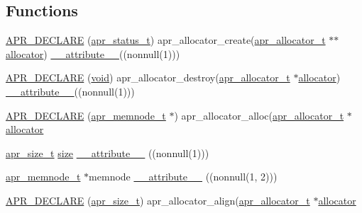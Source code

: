\subsection*{Functions}
\begin{DoxyCompactItemize}
\item 
\hyperlink{group__apr__allocator_ga9cb19a118179bbd8625eacfec66a9ab8}{A\+P\+R\+\_\+\+D\+E\+C\+L\+A\+RE} (\hyperlink{group__apr__errno_gaa5105fa83cc322f09382292db8b47593}{apr\+\_\+status\+\_\+t}) apr\+\_\+allocator\+\_\+create(\hyperlink{structapr__allocator__t}{apr\+\_\+allocator\+\_\+t} $\ast$$\ast$\hyperlink{group__apr__pools_ga3d4c7b6ba19a3b46b6fecdee3d867787}{allocator}) \hyperlink{group__APR__Util__Bucket__Brigades_gae0af316ed59541b70389da41aaeef4b6}{\+\_\+\+\_\+attribute\+\_\+\+\_\+}((nonnull(1)))
\item 
\hyperlink{group__apr__allocator_gab3ed16bee8def122c1d7c8f822ee0a5e}{A\+P\+R\+\_\+\+D\+E\+C\+L\+A\+RE} (\hyperlink{group__MOD__ISAPI_gacd6cdbf73df3d9eed42fa493d9b621a6}{void}) apr\+\_\+allocator\+\_\+destroy(\hyperlink{structapr__allocator__t}{apr\+\_\+allocator\+\_\+t} $\ast$\hyperlink{group__apr__pools_ga3d4c7b6ba19a3b46b6fecdee3d867787}{allocator}) \hyperlink{group__APR__Util__Bucket__Brigades_gae0af316ed59541b70389da41aaeef4b6}{\+\_\+\+\_\+attribute\+\_\+\+\_\+}((nonnull(1)))
\item 
\hyperlink{group__apr__allocator_ga1a358d9857909db42118ab336d2ed241}{A\+P\+R\+\_\+\+D\+E\+C\+L\+A\+RE} (\hyperlink{structapr__memnode__t}{apr\+\_\+memnode\+\_\+t} $\ast$) apr\+\_\+allocator\+\_\+alloc(\hyperlink{structapr__allocator__t}{apr\+\_\+allocator\+\_\+t} $\ast$\hyperlink{group__apr__pools_ga3d4c7b6ba19a3b46b6fecdee3d867787}{allocator}
\item 
\hyperlink{group__apr__platform_gaaa72b2253f6f3032cefea5712a27540e}{apr\+\_\+size\+\_\+t} \hyperlink{README_8txt_a870076999eb1486aa63d2e2cf5cdfa55}{size} \hyperlink{group__apr__allocator_gae0af316ed59541b70389da41aaeef4b6}{\+\_\+\+\_\+attribute\+\_\+\+\_\+} ((nonnull(1)))
\item 
\hyperlink{structapr__memnode__t}{apr\+\_\+memnode\+\_\+t} $\ast$memnode \hyperlink{group__apr__allocator_gae3414f52c685559fb6384c523991b96f}{\+\_\+\+\_\+attribute\+\_\+\+\_\+} ((nonnull(1, 2)))
\item 
\hyperlink{group__apr__allocator_ga1f88d1052393c7c22c1e2e2fef1c1067}{A\+P\+R\+\_\+\+D\+E\+C\+L\+A\+RE} (\hyperlink{group__apr__platform_gaaa72b2253f6f3032cefea5712a27540e}{apr\+\_\+size\+\_\+t}) apr\+\_\+allocator\+\_\+align(\hyperlink{structapr__allocator__t}{apr\+\_\+allocator\+\_\+t} $\ast$\hyperlink{group__apr__pools_ga3d4c7b6ba19a3b46b6fecdee3d867787}{allocator}
$$
\end{DoxyCompactItemize}
